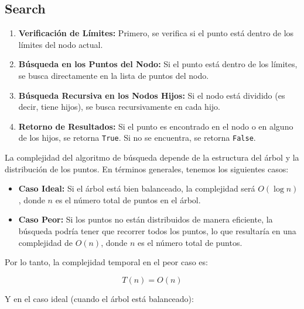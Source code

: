 \documentclass{article}
\begin{document}
\subsection{Search}
\begin{enumerate}
    \item \textbf{Verificación de Límites:} Primero, se verifica si el punto está dentro de los límites del nodo actual.
    
    
    \item \textbf{Búsqueda en los Puntos del Nodo:} Si el punto está dentro de los límites, se busca directamente en la lista de puntos del nodo.\\
    
    
    \item \textbf{Búsqueda Recursiva en los Nodos Hijos:} Si el nodo está dividido (es decir, tiene hijos), se busca recursivamente en cada hijo.\\
    
    
    \item \textbf{Retorno de Resultados:} Si el punto es encontrado en el nodo o en alguno de los hijos, se retorna \texttt{True}. Si no se encuentra, se retorna \texttt{False}.
    
\end{enumerate}
La complejidad del algoritmo de búsqueda depende de la estructura del árbol y la distribución de los puntos. En términos generales, tenemos los siguientes casos:

\begin{itemize}
    \item \textbf{Caso Ideal:} Si el árbol está bien balanceado, la complejidad será \( O(\log n) \), donde \( n \) es el número total de puntos en el árbol.
    
    \item \textbf{Caso Peor:} Si los puntos no están distribuidos de manera eficiente, la búsqueda podría tener que recorrer todos los puntos, lo que resultaría en una complejidad de \( O(n) \), donde \( n \) es el número total de puntos.
\end{itemize}

Por lo tanto, la complejidad temporal en el peor caso es:

\[
T(n) = O(n)
\]

Y en el caso ideal (cuando el árbol está balanceado):
\end{document}
